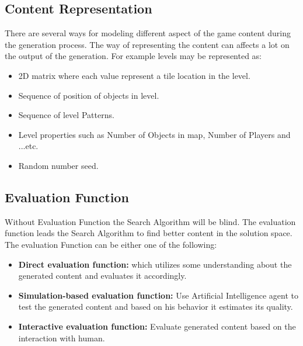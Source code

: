\subsection{Content Representation}
There are several ways for modeling different aspect of the game content during the generation process. The way of representing the content can affects a lot on the output of the generation. For example levels may be represented as:\cite{pcgBookSearch}
\begin{itemize}\itemsep0pt \parskip0pt 
	\item 2D matrix where each value represent a tile location in the level.
	\item Sequence of position of objects in level.
	\item Sequence of level Patterns.
	\item Level properties such as Number of Objects in map, Number of Players and ...etc.
	\item Random number seed.
\end{itemize}
\subsection{Evaluation Function}
Without Evaluation Function the Search Algorithm will be blind. The evaluation function leads the Search Algorithm to find better content in the solution space. The evaluation Function can be either one of the following:\cite{pcgBookSearch}
\begin{itemize}\itemsep0pt \parskip0pt 
	\item \textbf{Direct evaluation function:} which utilizes some understanding about the generated content and evaluates it accordingly.
	\item \textbf{Simulation-based evaluation function:} Use Artificial Intelligence agent to test the generated content and based on his behavior it estimates its quality.
	\item \textbf{Interactive evaluation function:} Evaluate generated content based on the interaction with human.
\end{itemize}


